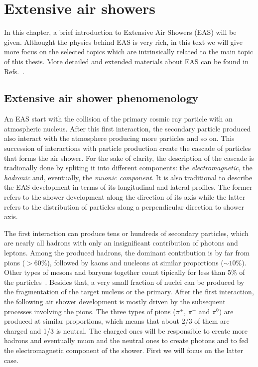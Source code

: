 \chapter[Extensive air showers and UHECR composition]{Extensive air showers}
\label{sec:showers}


In this chapter, a brief introduction to Extensive Air Showers (EAS)
will be given. Althought the physics behind EAS is very rich,
in this text we will give more focus on the selected topics
which are intrinsically related to the main topic of this thesis.
More detailed and extended materials about EAS can be found
in Refs.~\cite{GaisserBook,GriederBook}.


\section{Extensive air shower phenomenology}
\label{sec:showers:phen}

An EAS start with the collision of the primary cosmic ray particle
with an atmospheric nucleus. After this first interaction, the secondary
particle produced also interact with the atmosphere producing more
particles and so on. This succession of interactions with particle production
create the cascade of particles that forms the air shower.
For the sake of clarity, the description of the cascade is tradionally
done by spliting it into different components: the \emph{electromagnetic},
the \emph{hadronic} and, eventually, the \emph{muonic component}. It is also traditional
to describe the EAS development in terms of its longitudinal and lateral profiles.
The former refers to the shower development along the direction of its axis
while the latter refers to the distribution of particles
along a perpendicular direction to shower axis.


The first interaction can produce tens or hundreds of
secondary particles, which are nearly all hadrons
with only an insignificant contribution of photons and leptons.
Among the produced hadrons, the dominant contribution is by far from pions ($>60\%$),
followed by kaons and nucleons at similar proportions ($\sim 10\%$). Other
types of mesons and baryons together count tipically for less than 5\% of
the particles~\cite{Calcagni:2017tws}.
Besides that, a very small fraction of nuclei can be produced
by the fragmentation of the target nucleus or the primary.
After the first interaction, the following air shower development is mostly driven
by the subsequent processes involving the pions. The three types of pions ($\pi^+$, $\pi^-$ and $\pi^0$)
are produced at similar proportions, which means that about 2/3 of them are charged and
1/3 is neutral. The charged ones will be responsible to create more
hadrons and eventually muon and the neutral ones to create photons and
to fed the electromagnetic component of the shower.
First we will focus on the latter case.

